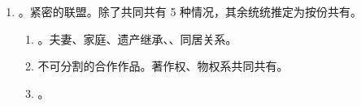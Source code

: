 \begin{enumerate}
\begin{enumerate}
\begin{enumerate}
\begin{enumerate}
\begin{kk}{优先购买权。对外转让、同等条件、转让自由}
\begin{itemize}
                                    \item 转让自由。民商不一致。民事通知（诚信原则，15 日），商事同意（30 日）。不要混。
                                    \item 同等条件/镜面规则。都要买 \yjt 有约从约 \yjt 协商 \yjt 按比例行权（不影响原来架构）。
                                  \end{itemize}
                                \end{kk}
                          \item 分割。有约从约 \yjt [无约、重大理由]随时。。
                        \end{enumerate}
                  \item 外部。主要是侵权问题。，对内按份承担/追偿。
                \end{enumerate}
          \item {}。紧密的联盟。除了共同共有 5 种情况，其余统统推定为按份共有。
                \begin{enumerate}
                  \item {}。夫妻、家庭、遗产继承、、同居关系。
                  \item 不可分割的合作作品。著作权、物权系共同共有。
                  \item {}。
                \end{enumerate}
        \end{enumerate}
\end{enumerate}
